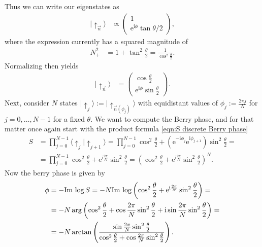 \documentclass[english, parskip=full]{scrartcl}
\newcommand{\brak}{}
\newcommand{\kla}{}
\newcommand{\tecxt}{}
\newcommand{\Ket}{}
\renewcommand{\i}{\text{i}}
\newcommand{\e}{\text{e}}
\begin{document}
Thus we can write our eigenstates as
\begin{align}
\Ket | \uparrow_{\vec{n}} \rangle &\propto \begin{pmatrix}
1 \\ \e^{\i\phi}\tan\theta/2
\end{pmatrix},
\end{align}
where the expression currently has a squared magnitude of
\begin{align}
N_+^2 &= 1 + \tan^2\frac{\theta}{2} = \frac{1}{\cos^2\frac{\theta}{2}} .
\end{align}
Normalizing then yields
\begin{align}
\Ket | \uparrow_{\vec{n}} \rangle &= \begin{pmatrix}
\cos\frac{\theta}{2} \\ \e^{\i\phi}\sin\frac{\theta}{2}
\end{pmatrix}.
\end{align}
Next, consider $N$ states $\Ket | \uparrow_j \rangle := \Ket | \uparrow_{\vec{n}(\phi_j)} \rangle$ with equidistant values of $\phi_j := \frac{2\pi j}{N}$ for $j = 0,\dots,N-1$ for a fixed $\theta$.
We want to compute the Berry phase, and for that matter once again start with the product formula \eqref{eqn:S discrete Berry phase}
\begin{align}
S &= \prod_{j=0}^{N-1} \brak\langle \uparrow_j | \uparrow_{j+1} \rangle =  \prod_{j=0}^{N-1} \cos^2\frac{\theta}{2} + \kla\left( \e^{-\i\phi_j}\e^{\i\phi_{j+1}} \right) \sin^2\frac{\theta}{2} = \\
&= \prod_{j=0}^{N-1} \cos^2\frac{\theta}{2} + \e^{\i \frac{2\pi}{N}} \sin^2\frac{\theta}{2} = \kla\left( \cos^2\frac{\theta}{2} + \e^{\i \frac{2\pi}{N}} \sin^2\frac{\theta}{2} \right)^N.
\end{align}
Now the berry phase is given by
\begin{align}
\phi &= -\tecxt\text{Im\,}\log S = -N\tecxt\text{Im\,} \log\kla\left( \cos^2\frac{\theta}{2} + \e^{\i \frac{2\pi }{N}} \sin^2\frac{\theta}{2} \right) = \\
&= -N \arg\kla\left( \cos^2\frac{\theta}{2} + \cos\frac{2\pi }{N} \sin^2\frac{\theta}{2}  + \i\sin\frac{2\pi}{N}\sin^2\frac{\theta}{2} \right) = \\
&= -N \arctan\kla\left( \frac{\sin\frac{2\pi }{N}\sin^2\frac{\theta}{2}}{\cos^2\frac{\theta}{2} + \cos\frac{2\pi }{N}\sin^2\frac{\theta}{2}} \right).
\end{align}
\end{document}

